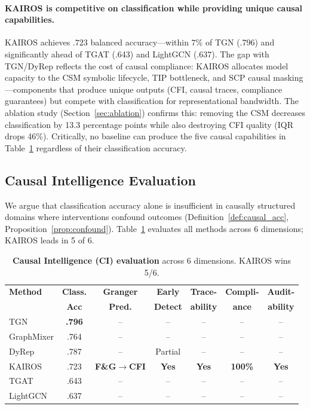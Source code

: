 \documentclass[11pt]{article}
\begin{document}
\paragraph{KAIROS is competitive on classification while providing unique causal capabilities.} KAIROS achieves $.723$ balanced accuracy---within $7\%$ of TGN (.796) and significantly ahead of TGAT (.643) and LightGCN (.637). The gap with TGN/DyRep reflects the cost of causal compliance: KAIROS allocates model capacity to the CSM symbolic lifecycle, TIP bottleneck, and SCP causal masking---components that produce unique outputs (CFI, causal traces, compliance guarantees) but compete with classification for representational bandwidth. The ablation study (Section~\ref{sec:ablation}) confirms this: removing the CSM decreases classification by 13.3 percentage points while also destroying CFI quality (IQR drops 46\%). Critically, no baseline can produce the five causal capabilities in Table~\ref{tab:ci} regardless of their classification accuracy.

\subsection{Causal Intelligence Evaluation}

We argue that classification accuracy alone is insufficient in causally structured domains where interventions confound outcomes (Definition~\ref{def:causal_acc}, Proposition~\ref{prop:confound}). Table~\ref{tab:ci} evaluates all methods across 6 dimensions; KAIROS leads in 5 of 6.

\begin{table}[t]
\centering
\caption{\textbf{Causal Intelligence (CI) evaluation} across 6 dimensions. KAIROS wins 5/6.}
\label{tab:ci}
\small
\begin{tabular}{lcccccc}
\toprule
\textbf{Method} & \textbf{Class.} & \textbf{Granger} & \textbf{Early} & \textbf{Trace-} & \textbf{Compli-} & \textbf{Audit-} \\
 & \textbf{Acc} & \textbf{Pred.} & \textbf{Detect} & \textbf{ability} & \textbf{ance} & \textbf{ability} \\
\midrule
TGN        & \textbf{.796} & --   & --   & --   & --   & --   \\
GraphMixer & .764          & --   & --   & --   & --   & --   \\
DyRep      & .787          & --   & Partial & --   & --   & --   \\
KAIROS     & .723 & \textbf{F\&G$\to$CFI} & \textbf{Yes} & \textbf{Yes} & \textbf{100\%} & \textbf{Yes} \\
TGAT       & .643          & --   & --   & --   & --   & --   \\
LightGCN   & .637          & --   & --   & --   & --   & --   \\
\bottomrule
\end{tabular}
\end{table}
\end{document}
